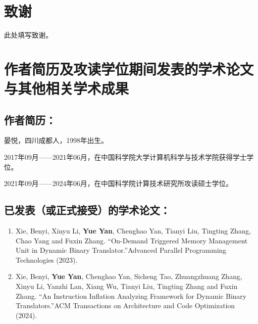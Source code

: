 \chapter[致谢]{致\quad 谢}%

此处填写致谢。


\chapter{作者简历及攻读学位期间发表的学术论文与其他相关学术成果}

\section*{作者简历：}
晏悦，四川成都人，1998年出生。

2017年09月——2021年06月，在中国科学院大学计算机科学与技术学院获得学士学位。

2021年09月——2024年06月，在中国科学院计算技术研究所攻读硕士学位。

\section*{已发表（或正式接受）的学术论文：}

{
\setlist[enumerate]{}%
\begin{enumerate}[nosep]
    \item Xie, Benyi, Xinyu Li, \textbf{Yue Yan}, Chenghao Yan, Tianyi Liu, Tingting Zhang, Chao
    Yang and Fuxin Zhang. “On-Demand Triggered Memory Management Unit
    in Dynamic Binary Translator.”Advanced Parallel Programming Technologies
    (2023).

    \item Xie, Benyi, \textbf{Yue Yan}, Chenghao Yan, Sicheng Tao, Zhuangzhuang Zhang, Xinyu
    Li, Yanzhi Lan, Xiang Wu, Tianyi Liu, Tingting Zhang and Fuxin Zhang.
    “An Instruction Inflation Analyzing Framework for Dynamic Binary Translators.”ACM
    Transactions on Architecture and Code Optimization (2024).
\end{enumerate}
}


